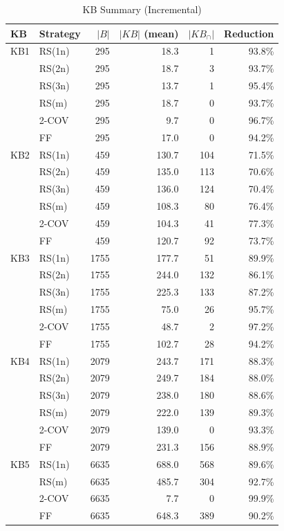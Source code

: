 \begin{table}[htbp]
\centering
\caption{KB Summary (Incremental)}
\label{tab:kb_summary_incremental}
\begin{tabular}{llrrrr}
\toprule
KB & Strategy & $|B|$ & $|KB|$ (mean) & $|KB_{\cap}|$ & Reduction \\
\midrule
KB1 & RS(1n) & 295 & 18.3 & 1 & 93.8\% \\
 & RS(2n) & 295 & 18.7 & 3 & 93.7\% \\
 & RS(3n) & 295 & 13.7 & 1 & 95.4\% \\
 & RS(m) & 295 & 18.7 & 0 & 93.7\% \\
 & 2-COV & 295 & 9.7 & 0 & 96.7\% \\
 & FF & 295 & 17.0 & 0 & 94.2\% \\
\midrule
KB2 & RS(1n) & 459 & 130.7 & 104 & 71.5\% \\
 & RS(2n) & 459 & 135.0 & 113 & 70.6\% \\
 & RS(3n) & 459 & 136.0 & 124 & 70.4\% \\
 & RS(m) & 459 & 108.3 & 80 & 76.4\% \\
 & 2-COV & 459 & 104.3 & 41 & 77.3\% \\
 & FF & 459 & 120.7 & 92 & 73.7\% \\
\midrule
KB3 & RS(1n) & 1755 & 177.7 & 51 & 89.9\% \\
 & RS(2n) & 1755 & 244.0 & 132 & 86.1\% \\
 & RS(3n) & 1755 & 225.3 & 133 & 87.2\% \\
 & RS(m) & 1755 & 75.0 & 26 & 95.7\% \\
 & 2-COV & 1755 & 48.7 & 2 & 97.2\% \\
 & FF & 1755 & 102.7 & 28 & 94.2\% \\
\midrule
KB4 & RS(1n) & 2079 & 243.7 & 171 & 88.3\% \\
 & RS(2n) & 2079 & 249.7 & 184 & 88.0\% \\
 & RS(3n) & 2079 & 238.0 & 180 & 88.6\% \\
 & RS(m) & 2079 & 222.0 & 139 & 89.3\% \\
 & 2-COV & 2079 & 139.0 & 0 & 93.3\% \\
 & FF & 2079 & 231.3 & 156 & 88.9\% \\
\midrule
KB5 & RS(1n) & 6635 & 688.0 & 568 & 89.6\% \\
 & RS(m) & 6635 & 485.7 & 304 & 92.7\% \\
 & 2-COV & 6635 & 7.7 & 0 & 99.9\% \\
 & FF & 6635 & 648.3 & 389 & 90.2\% \\
\bottomrule
\end{tabular}
\end{table}

